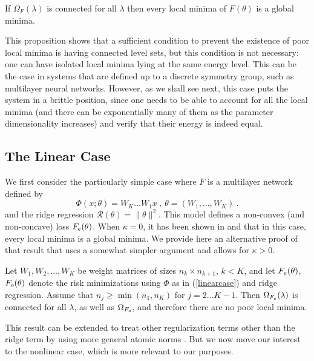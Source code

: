 \begin{proposition}
\label{connectedminima}
If $\Omega_F(\lambda)$ is connected for all $\lambda$ then every local minima of $F(\theta)$ is a global minima. 
\end{proposition}

This proposition shows that a sufficient condition to prevent the existence of poor local minima is having connected level sets, but this condition is not necessary: one can have isolated local minima lying 
at the same energy level. This can be the case in systems that are defined up to 
a discrete symmetry group, such as multilayer neural networks. However, as we shall see next, this case puts the system in a brittle position, since one needs to be able to account for all the local minima (and there can be exponentially many of them as the parameter dimensionality increases) and verify that their energy is indeed equal. 

\subsection{The Linear Case}

We first consider the 
particularly simple case where 
$F$ is a multilayer network defined by
\begin{equation}
\label{linearcase}
\Phi(x;\theta) = W_K \dots W_1 x~,~\theta = (W_1, \dots, W_K)~.
\end{equation}
and the ridge regression $\mathcal{R}(\theta) =\| \theta \|^2$. This model defines a non-convex (and non-concave) loss $F_{e}(\theta)$.
When $\kappa = 0$, it has been shown in \cite{saxe2013exact} and \cite{kawaguchi2016deep} that in this case, 
every local minima is a global minima.  
We provide here an alternative proof of that result that uses
a somewhat simpler argument and allows for $\kappa > 0$. 


\begin{proposition}
\label{proplinear}
Let $W_1, W_2, \dots, W_K$ be weight matrices of sizes 
$n_k \times n_{k+1}$, $k < K$, and let $F_{e}(\theta)$, $F_{o}(\theta)$ 
denote the risk minimizations using $\Phi$ as in (\ref{linearcase}) and ridge regression.
Assume that $n_j \geq \min(n_1, n_K)$ for $j=2 \dots K-1$.
Then $\Omega_{F_{e}}(\lambda)$ is connected for all $\lambda$, as well as $\Omega_{F_{o}}$, 
and therefore there are no poor local minima.  
\end{proposition}
This result can be extended to treat other regularization terms other than the ridge term 
by using more general atomic norms \cite{bach2013convex}. But we now move our interest to the nonlinear case, which is more relevant to our purposes. 


